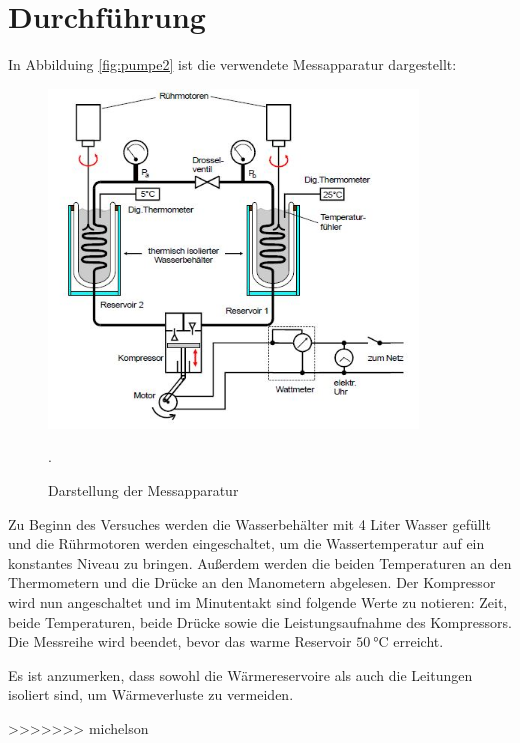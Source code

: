 \section{Durchführung}
In Abbilduing \ref{fig:pumpe2} ist die verwendete Messapparatur dargestellt:
\begin{figure}[H]
  \centering
  \includegraphics[height=9cm]{pumpe2.JPG}
  \caption{Darstellung der Messapparatur}
  \cite{skript}.
  \label{pumpe2}
\end{figure}

Zu Beginn des Versuches werden die Wasserbehälter mit 4 Liter Wasser gefüllt und
die Rührmotoren werden eingeschaltet, um die Wassertemperatur auf ein konstantes
Niveau zu bringen. Außerdem werden die beiden Temperaturen an den Thermometern und die Drücke an den Manometern abgelesen.
Der Kompressor wird nun angeschaltet und im Minutentakt sind folgende Werte zu notieren:
Zeit, beide Temperaturen, beide Drücke sowie die Leistungsaufnahme des Kompressors.
Die Messreihe wird beendet, bevor das warme Reservoir $\SI{50}{\celsius}$ erreicht.

Es ist anzumerken, dass sowohl die Wärmereservoire als auch die Leitungen isoliert sind,
um Wärmeverluste zu vermeiden.


\label{sec:Durchführung}
>>>>>>> michelson

